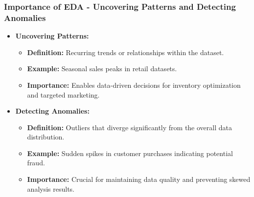 \documentclass{beamer}
\begin{document}
\begin{frame}[fragile]
    \frametitle{Importance of EDA - Uncovering Patterns and Detecting Anomalies}
    \begin{itemize}
        \item \textbf{Uncovering Patterns:}
        \begin{itemize}
            \item \textbf{Definition:} Recurring trends or relationships within the dataset.
            \item \textbf{Example:} Seasonal sales peaks in retail datasets.
            \item \textbf{Importance:} Enables data-driven decisions for inventory optimization and targeted marketing.
        \end{itemize}

        \item \textbf{Detecting Anomalies:}
        \begin{itemize}
            \item \textbf{Definition:} Outliers that diverge significantly from the overall data distribution.
            \item \textbf{Example:} Sudden spikes in customer purchases indicating potential fraud.
            \item \textbf{Importance:} Crucial for maintaining data quality and preventing skewed analysis results.
        \end{itemize}
    \end{itemize}
\end{frame}
\end{document}
